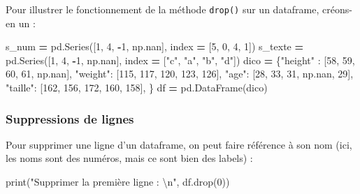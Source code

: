\documentclass[12pt,]{book}
\newenvironment{Shaded}{\begin{snugshade}}{\end{snugshade}}
\newcommand{\DecValTok}[1]{\textcolor[rgb]{0.00,0.00,0.81}{#1}}
\newcommand{\CharTok}[1]{\textcolor[rgb]{0.31,0.60,0.02}{#1}}
\newcommand{\StringTok}[1]{\textcolor[rgb]{0.31,0.60,0.02}{#1}}
\newcommand{\OperatorTok}[1]{\textcolor[rgb]{0.81,0.36,0.00}{\textbf{#1}}}
\newcommand{\BuiltInTok}[1]{#1}
\newcommand{\NormalTok}[1]{#1}
\numberwithin{equation}{section}
\numberwithin{countremarque}{section}
\begin{document}
Pour illustrer le fonctionnement de la méthode \texttt{drop()} sur un
dataframe, créons-en un :

\begin{Shaded}
\begin{Highlighting}[]
\NormalTok{s_num }\OperatorTok{=}\NormalTok{ pd.Series([}\DecValTok{1}\NormalTok{, }\DecValTok{4}\NormalTok{, }\OperatorTok{-}\DecValTok{1}\NormalTok{, np.nan],}
\NormalTok{             index }\OperatorTok{=}\NormalTok{ [}\DecValTok{5}\NormalTok{, }\DecValTok{0}\NormalTok{, }\DecValTok{4}\NormalTok{, }\DecValTok{1}\NormalTok{])}
\NormalTok{s_texte }\OperatorTok{=}\NormalTok{ pd.Series([}\DecValTok{1}\NormalTok{, }\DecValTok{4}\NormalTok{, }\OperatorTok{-}\DecValTok{1}\NormalTok{, np.nan],}
\NormalTok{             index }\OperatorTok{=}\NormalTok{ [}\StringTok{"c"}\NormalTok{, }\StringTok{"a"}\NormalTok{, }\StringTok{"b"}\NormalTok{, }\StringTok{"d"}\NormalTok{])}
\NormalTok{dico }\OperatorTok{=}\NormalTok{ \{}\StringTok{"height"}\NormalTok{ : [}\DecValTok{58}\NormalTok{, }\DecValTok{59}\NormalTok{, }\DecValTok{60}\NormalTok{, }\DecValTok{61}\NormalTok{, np.nan],}
        \StringTok{"weight"}\NormalTok{: [}\DecValTok{115}\NormalTok{, }\DecValTok{117}\NormalTok{, }\DecValTok{120}\NormalTok{, }\DecValTok{123}\NormalTok{, }\DecValTok{126}\NormalTok{],}
        \StringTok{"age"}\NormalTok{: [}\DecValTok{28}\NormalTok{, }\DecValTok{33}\NormalTok{, }\DecValTok{31}\NormalTok{, np.nan, }\DecValTok{29}\NormalTok{],}
        \StringTok{"taille"}\NormalTok{: [}\DecValTok{162}\NormalTok{, }\DecValTok{156}\NormalTok{, }\DecValTok{172}\NormalTok{, }\DecValTok{160}\NormalTok{, }\DecValTok{158}\NormalTok{],}
\NormalTok{       \} }
\NormalTok{df }\OperatorTok{=}\NormalTok{ pd.DataFrame(dico)}
\end{Highlighting}
\end{Shaded}

\subsubsection{Suppressions de lignes}\label{suppressions-de-lignes}

Pour supprimer une ligne d'un dataframe, on peut faire référence à son
nom (ici, les noms sont des numéros, mais ce sont bien des labels) :

\begin{Shaded}
\begin{Highlighting}[]
\BuiltInTok{print}\NormalTok{(}\StringTok{"Supprimer la première ligne :  }\CharTok{\textbackslash{}n}\StringTok{"}\NormalTok{, df.drop(}\DecValTok{0}\NormalTok{))}
\end{Highlighting}
\end{Shaded}
\end{document}
